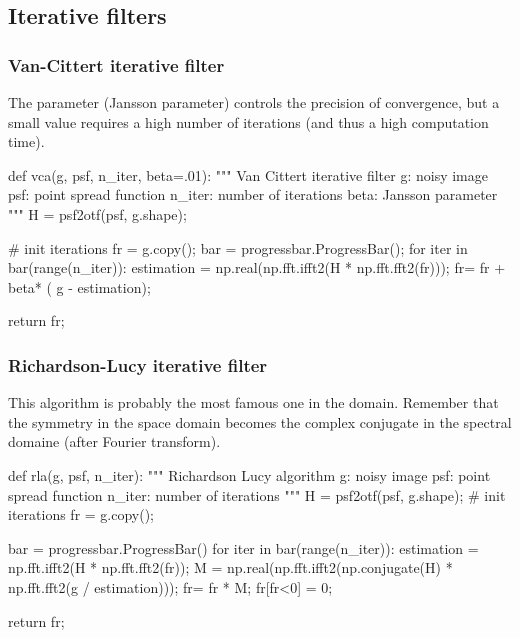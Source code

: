 \subsection{Iterative filters}
\subsubsection{Van-Cittert iterative filter}
The parameter (Jansson parameter) controls the precision of convergence, but a small value requires a high number of iterations (and thus a high computation time).
\begin{python}
def vca(g, psf, n_iter, beta=.01):
    """
    Van Cittert iterative filter
    g: noisy image
    psf: point spread function
    n_iter: number of iterations
    beta: Jansson parameter
    """
    H = psf2otf(psf, g.shape);
    
    # init iterations
    fr = g.copy();
    bar = progressbar.ProgressBar();
    for iter in bar(range(n_iter)):
        estimation = np.real(np.fft.ifft2(H * np.fft.fft2(fr)));
        fr= fr + beta* ( g - estimation);
        
    return fr; 
\end{python}

\subsubsection{Richardson-Lucy iterative filter}
This algorithm is probably the most famous one in the domain. Remember that the symmetry in the space domain becomes the complex conjugate in the spectral domaine (after Fourier transform).
\begin{python}
def rla(g, psf, n_iter):
    """
    Richardson Lucy algorithm
    g: noisy image
    psf: point spread function
    n_iter: number of iterations
    """
    H = psf2otf(psf, g.shape); 
    # init iterations
    fr = g.copy();
    
    bar = progressbar.ProgressBar()
    for iter in bar(range(n_iter)):
        estimation = np.fft.ifft2(H * np.fft.fft2(fr));
        M = np.real(np.fft.ifft2(np.conjugate(H) * np.fft.fft2(g / estimation)));
        fr= fr * M;
        fr[fr<0] = 0;
        
    return fr;
\end{python}


